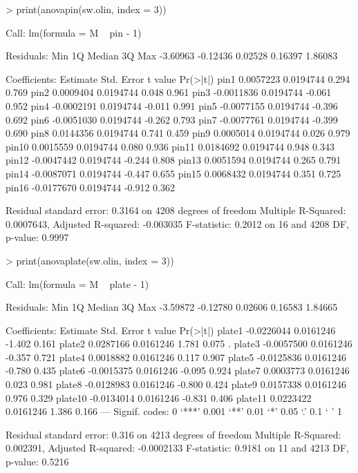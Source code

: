 \documentclass[a4paper,11pt]{article}
\begin{document}
\begin{Schunk}
\begin{Sinput}
> print(anovapin(sw.olin, index = 3))
\end{Sinput}
\begin{Soutput}
Call:
lm(formula = M ~ pin - 1)

Residuals:
     Min       1Q   Median       3Q      Max 
-3.60963 -0.12436  0.02528  0.16397  1.86083 

Coefficients:
        Estimate Std. Error t value Pr(>|t|)
pin1   0.0057223  0.0194744   0.294    0.769
pin2   0.0009404  0.0194744   0.048    0.961
pin3  -0.0011836  0.0194744  -0.061    0.952
pin4  -0.0002191  0.0194744  -0.011    0.991
pin5  -0.0077155  0.0194744  -0.396    0.692
pin6  -0.0051030  0.0194744  -0.262    0.793
pin7  -0.0077761  0.0194744  -0.399    0.690
pin8   0.0144356  0.0194744   0.741    0.459
pin9   0.0005014  0.0194744   0.026    0.979
pin10  0.0015559  0.0194744   0.080    0.936
pin11  0.0184692  0.0194744   0.948    0.343
pin12 -0.0047442  0.0194744  -0.244    0.808
pin13  0.0051594  0.0194744   0.265    0.791
pin14 -0.0087071  0.0194744  -0.447    0.655
pin15  0.0068432  0.0194744   0.351    0.725
pin16 -0.0177670  0.0194744  -0.912    0.362

Residual standard error: 0.3164 on 4208 degrees of freedom
Multiple R-Squared: 0.0007643,	Adjusted R-squared: -0.003035 
F-statistic: 0.2012 on 16 and 4208 DF,  p-value: 0.9997 
\end{Soutput}
\end{Schunk}


\begin{Schunk}
\begin{Sinput}
> print(anovaplate(sw.olin, index = 3))
\end{Sinput}
\begin{Soutput}
Call:
lm(formula = M ~ plate - 1)

Residuals:
     Min       1Q   Median       3Q      Max 
-3.59872 -0.12780  0.02606  0.16583  1.84665 

Coefficients:
          Estimate Std. Error t value Pr(>|t|)  
plate1  -0.0226044  0.0161246  -1.402    0.161  
plate2   0.0287166  0.0161246   1.781    0.075 .
plate3  -0.0057500  0.0161246  -0.357    0.721  
plate4   0.0018882  0.0161246   0.117    0.907  
plate5  -0.0125836  0.0161246  -0.780    0.435  
plate6  -0.0015375  0.0161246  -0.095    0.924  
plate7   0.0003773  0.0161246   0.023    0.981  
plate8  -0.0128983  0.0161246  -0.800    0.424  
plate9   0.0157338  0.0161246   0.976    0.329  
plate10 -0.0134014  0.0161246  -0.831    0.406  
plate11  0.0223422  0.0161246   1.386    0.166  
---
Signif. codes:  0 `***' 0.001 `**' 0.01 `*' 0.05 `.' 0.1 ` ' 1 

Residual standard error: 0.316 on 4213 degrees of freedom
Multiple R-Squared: 0.002391,	Adjusted R-squared: -0.0002133 
F-statistic: 0.9181 on 11 and 4213 DF,  p-value: 0.5216 
\end{Soutput}
\end{Schunk}
\end{document}
